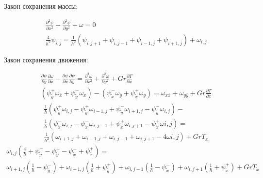 \documentclass[a4paper, 12pt]{article}
\numberwithin{equation}{section}
\newcommand{\der}[2]{\frac{\partial {#1}}{\partial {#2}}}
\newcommand{\dder}[2]{\frac{\partial^2 {#1}}{\partial {#2}^2}}
\newcommand{\psp}[2]{\psi_{\mathring{#1}}^{#2}}
\begin{document}
  Закон сохранения массы:

  \begin{gather*}
    \dder{\psi}{x} + \dder{\psi}{y} + \omega = 0
    \\
    \frac{4}{h^2}\psi_{i,j} = \frac{1}{h^2} \left(
      \psi_{i,j+1} + \psi_{i,j-1} + \psi_{i-1,j} + \psi_{i+1,j}
    \right) + \omega_{i,j}
  \end{gather*}

  Закон сохранения движения:

  \begin{gather*}
    \der{\psi}{y} \der{\omega}{x} - \der{\psi}{x} \der{\psi}{y} =
      \dder{\omega}{x} + \dder{\omega}{y} + Gr \der{T}{x}
    \\
    \left(
      \psp{y}{+} \omega_{\overline{x}} + \psp{y}{-} \omega_{x}
    \right) -
    \left(
      \psp{x}{-} \omega_{\overline{y}} + \psp{x}{+} \omega_{y}
    \right) =
    \omega_{x \overline{x}} + \omega_{y \overline{y}} + Gr \der{T}{x}
  \end{gather*}
  \begin{multline*}
    \frac{1}{h} \left(
      \psp{y}{+} \omega_{i, j} - \psp{y}{+} \omega_{i-1, j} +
      \psp{y}{-} \omega_{i+1, j} - \psp{y}{-} \omega_{i, j}
    \right) -
    \\
    \frac{1}{h} \left(
      \psp{x}{-} \omega_{i, j} - \psp{x}{-} \omega_{i, j-1} +
      \psp{x}{+} \omega_{i, j+1} - \psp{x}{+} \omega{i, j}
    \right) =
    \\
    \frac{1}{h^2} \left(
      \omega_{i+1, j} + \omega_{i-1, j} + \omega_{i, j-1} + \omega_{i, j+1} -
      4 \omega{i, j}
    \right) + Gr T_{\mathring{x}}
  \end{multline*}
  \begin{multline*}
    \omega_{i, j} \left(
      \frac{4}{h} + \psp{y}{+} - \psp{y}{-} - \psp{x}{-} + \psp{x}{+}
    \right) =
    \\
    \omega_{i+1, j} \left( \frac{1}{h} - \psp{y}{-} \right) +
    \omega_{i-1, j} \left( \frac{1}{h} + \psp{y}{+} \right) +
    \omega_{i, j-1} \left( \frac{1}{h} - \psp{x}{-} \right) +
    \omega_{i, j+1} \left( \frac{1}{h} + \psp{x}{+} \right) +
    Gr T_{\mathring{x}}
  \end{multline*}

\end{document}
